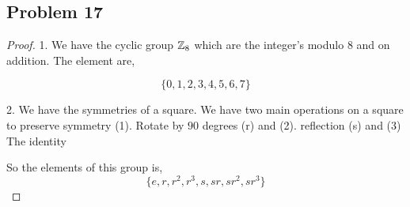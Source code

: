 \documentclass[a4paper]{report}
\begin{document}
\subsection*{Problem 17}
\begin{proof}
    1. We have the cyclic group $\mathbb{Z}_8$ which are the integer's modulo  $8$ and on addition. The element are, 

    $$ \{0,1,2,3,4,5,6,7\} $$ 

    2. We have the symmetries of a square. We have two main operations on a square to preserve symmetry (1). Rotate by $90$ degrees (r) and (2). reflection (s) and (3) The identity

    So the elements of this group is, 
    $$ \{e, r, r^2, r^{3}, s, sr, s r^{2}, s r^{3}\} $$ 
\end{proof}
\end{document}
